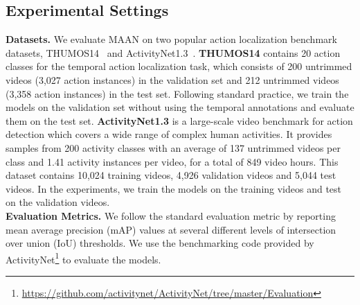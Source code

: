 \documentclass{article} \usepackage{iclr2019_conference,times}
\begin{document}
\subsection{Experimental Settings} 
\textbf{Datasets.} We evaluate MAAN on two popular action localization benchmark datasets, THUMOS14~\citep{THUMOS14} and ActivityNet1.3~\citep{ActivityNet}. \textbf{THUMOS14} contains 20 action classes for the temporal action localization task, which consists of 200 untrimmed videos (3,027 action instances) in the validation set and 212 untrimmed videos (3,358 action instances) in the test set. 
Following standard practice, we train the models on the validation set without using the temporal annotations and evaluate them on the test set. \textbf{ActivityNet1.3} is a large-scale video benchmark for action detection which covers a wide range of complex human activities. It provides samples from 200 activity classes with an average of 137 untrimmed videos per class and 1.41 activity instances per video, for a total of 849 video hours. This dataset contains 10,024 training videos, 4,926 validation videos and 5,044 test videos. In the experiments, we train the models on the training videos and test on the validation videos. \\
\textbf{Evaluation Metrics.} We follow the standard evaluation metric by reporting mean average precision (mAP) values at several different levels of intersection over union (IoU) thresholds. 
We use the benchmarking code provided by ActivityNet\footnote{\url{https://github.com/activitynet/ActivityNet/tree/master/Evaluation}} to evaluate the models. 

\vspace{-2mm}
\end{document}
